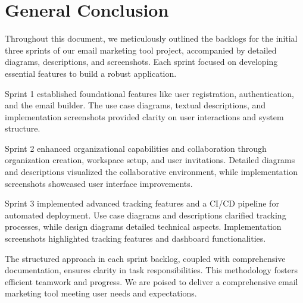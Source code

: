 \chapter*{General Conclusion}

Throughout this document, we meticulously outlined the backlogs for the initial three sprints of our email marketing tool project, accompanied by detailed diagrams, descriptions, and screenshots. Each sprint focused on developing essential features to build a robust application.

\vspace{10pt}

Sprint 1 established foundational features like user registration, authentication, and the email builder. The use case diagrams, textual descriptions, and implementation screenshots provided clarity on user interactions and system structure.

\vspace{10pt}

Sprint 2 enhanced organizational capabilities and collaboration through organization creation, workspace setup, and user invitations. Detailed diagrams and descriptions visualized the collaborative environment, while implementation screenshots showcased user interface improvements.

\vspace{10pt}

Sprint 3 implemented advanced tracking features and a CI/CD pipeline for automated deployment. Use case diagrams and descriptions clarified tracking processes, while design diagrams detailed technical aspects. Implementation screenshots highlighted tracking features and dashboard functionalities.

\vspace{10pt}

The structured approach in each sprint backlog, coupled with comprehensive documentation, ensures clarity in task responsibilities. This methodology fosters efficient teamwork and progress. We are poised to deliver a comprehensive email marketing tool meeting user needs and expectations.
